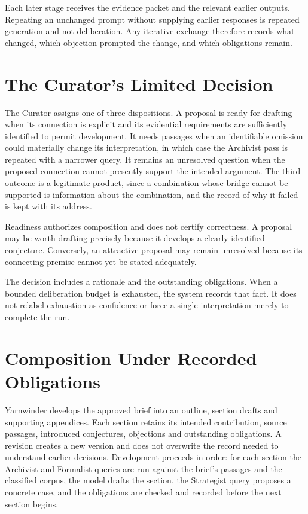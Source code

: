 \documentclass[11pt]{article}
\begin{document}
Each later stage receives the evidence packet and the relevant earlier outputs. Repeating an unchanged prompt without supplying earlier responses is repeated generation and not deliberation. Any iterative exchange therefore records what changed, which objection prompted the change, and which obligations remain.

\section{The Curator's Limited Decision}

The Curator assigns one of three dispositions. A proposal is ready for drafting when its connection is explicit and its evidential requirements are sufficiently identified to permit development. It needs passages when an identifiable omission could materially change its interpretation, in which case the Archivist pass is repeated with a narrower query. It remains an unresolved question when the proposed connection cannot presently support the intended argument. The third outcome is a legitimate product, since a combination whose bridge cannot be supported is information about the combination, and the record of why it failed is kept with its address.

Readiness authorizes composition and does not certify correctness. A proposal may be worth drafting precisely because it develops a clearly identified conjecture. Conversely, an attractive proposal may remain unresolved because its connecting premise cannot yet be stated adequately.

The decision includes a rationale and the outstanding obligations. When a bounded deliberation budget is exhausted, the system records that fact. It does not relabel exhaustion as confidence or force a single interpretation merely to complete the run.

\section{Composition Under Recorded Obligations}

Yarnwinder develops the approved brief into an outline, section drafts and supporting appendices. Each section retains its intended contribution, source passages, introduced conjectures, objections and outstanding obligations. A revision creates a new version and does not overwrite the record needed to understand earlier decisions. Development proceeds in order: for each section the Archivist and Formalist queries are run against the brief's passages and the classified corpus, the model drafts the section, the Strategist query proposes a concrete case, and the obligations are checked and recorded before the next section begins.
\end{document}
